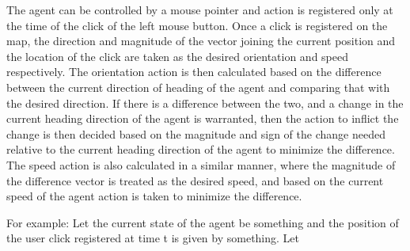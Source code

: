 The agent can be controlled by a mouse pointer and action is registered only at the time of the click of the left mouse button. Once a click is registered on the map, the direction and magnitude of the vector joining the current position and the location of the click are taken as the desired orientation and speed respectively.  
The orientation action is then calculated based on the difference between the current direction of heading of the agent and comparing that with the desired direction. If there is a difference between the two, and a change in the current heading direction of the agent is warranted, then the action to inflict the change is then decided based on the magnitude and sign of the change needed relative to the current heading direction of the agent to minimize the difference.
The speed action is also calculated in a similar manner, where the magnitude of the difference vector is treated as the desired speed, and based on the current speed of the agent action is taken to minimize the difference.

For example:
Let the current state of the agent be something and the position of the user click registered at time t is given by something. Let 



